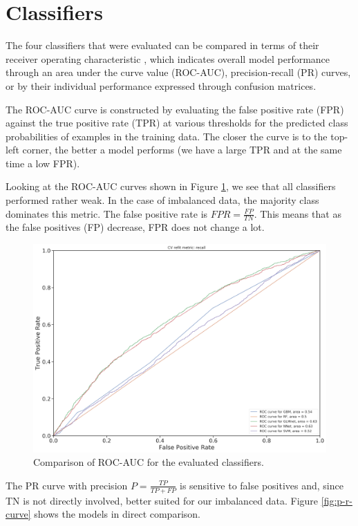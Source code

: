 \documentclass[
  11pt,
  a4paper,
  DIV=12,captions=tableheading,oneside,titlepage=firstiscover,abstracton]{scrreprt}
\begin{document}
\hypertarget{classifiers}{%
\section{Classifiers}\label{classifiers}}

The four classifiers that were evaluated can be compared in terms of their receiver operating characteristic , which indicates overall model performance through an area under the curve value (ROC-AUC), precision-recall (PR) curves, or by their individual performance expressed through confusion matrices.

The ROC-AUC curve is constructed by evaluating the false positive rate (FPR) against the true positive rate (TPR) at various thresholds for the predicted class probabilities of examples in the training data. The closer the curve is to the top-left corner, the better a model performs (we have a large TPR and at the same time a low FPR).

Looking at the ROC-AUC curves shown in Figure \ref{fig:roc-auc-curve}, we see that all classifiers performed rather weak. In the case of imbalanced data, the majority class dominates this metric. The false positive rate is \(FPR = \frac{FP}{TN}\). This means that as the false positives (FP) decrease, FPR does not change a lot.



\begin{figure}

{\centering \includegraphics[width=0.6\linewidth]{figures/learning/roc_auc_compared_refit_recall} 

}

\caption{Comparison of ROC-AUC for the evaluated classifiers.}\label{fig:roc-auc-curve}
\end{figure}

The PR curve with precision \(P = \frac{TP}{TP+FP}\) is sensitive to false positives and, since TN is not directly involved, better suited for our imbalanced data. Figure \ref{fig:p-r-curve} shows the models in direct comparison.
\end{document}
